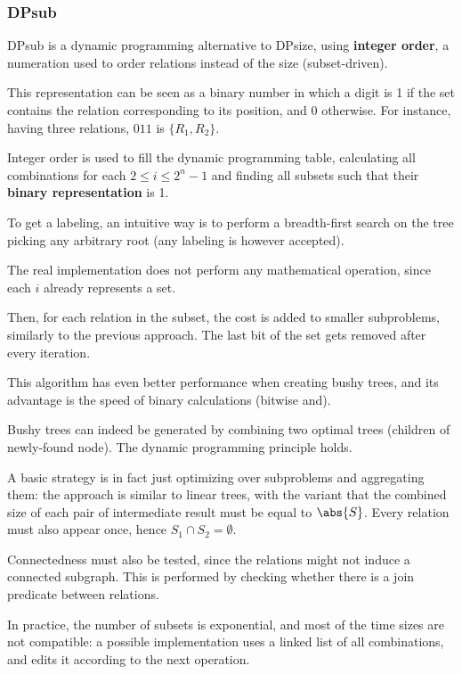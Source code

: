 \subsubsection{DPsub}
DPsub is a dynamic programming alternative to DPsize, using \textbf{integer order}, a numeration used to order relations instead of the size (subset-driven).

This representation can be seen as a binary number in which a digit is 1 if the set contains the relation corresponding to its position, and 0 otherwise. For instance, having three relations, $011$ is $\{R_1, R_2\}$.

Integer order is used to fill the dynamic programming table, calculating all combinations for each $2 \leq i \leq 2^n-1$ and finding all subsets such that their \textbf{binary representation} is 1.

To get a labeling, an intuitive way is to perform a breadth-first search on the tree picking any arbitrary root (any labeling is however accepted).

The real implementation does not perform any mathematical operation, since each $i$ already represents a set. 

Then, for each relation in the subset, the cost is added to smaller subproblems, similarly to the previous approach. The last bit of the set gets removed after every iteration.

This algorithm has even better performance when creating bushy trees, and its advantage is the speed of binary calculations (bitwise and). 

Bushy trees can indeed be generated by combining two optimal trees (children of newly-found node). The dynamic programming principle holds.

A basic strategy is in fact just optimizing over subproblems and aggregating them: the approach is similar to linear trees, with the variant that the combined size of each pair of intermediate result must be equal to $\abs{S}$. Every relation must also appear once, hence $S_1 \cap S_2 = \emptyset$.

Connectedness must also be tested, since the relations might not induce a connected subgraph. This is performed by checking whether there is a join predicate between relations.

In practice, the number of subsets is exponential, and most of the time sizes are not compatible: a possible implementation uses a linked list of all combinations, and edits it according to the next operation.

